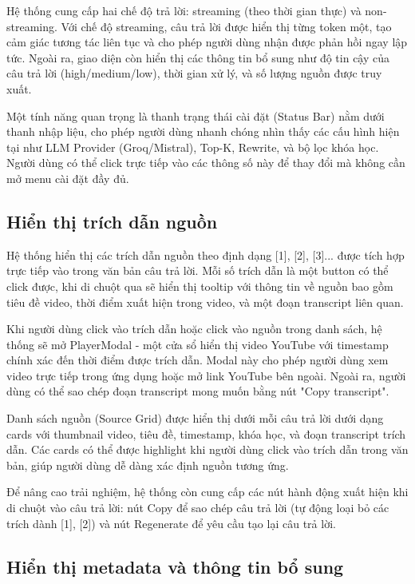 Hệ thống cung cấp hai chế độ trả lời: streaming (theo thời gian thực) và non-streaming. Với chế độ streaming, câu trả lời được hiển thị từng token một, tạo cảm giác tương tác liên tục và cho phép người dùng nhận được phản hồi ngay lập tức. Ngoài ra, giao diện còn hiển thị các thông tin bổ sung như độ tin cậy của câu trả lời (high/medium/low), thời gian xử lý, và số lượng nguồn được truy xuất.

Một tính năng quan trọng là thanh trạng thái cài đặt (Status Bar) nằm dưới thanh nhập liệu, cho phép người dùng nhanh chóng nhìn thấy các cấu hình hiện tại như LLM Provider (Groq/Mistral), Top-K, Rewrite, và bộ lọc khóa học. Người dùng có thể click trực tiếp vào các thông số này để thay đổi mà không cần mở menu cài đặt đầy đủ.

\subsection{Hiển thị trích dẫn nguồn}

Hệ thống hiển thị các trích dẫn nguồn theo định dạng [1], [2], [3]... được tích hợp trực tiếp vào trong văn bản câu trả lời. Mỗi số trích dẫn là một button có thể click được, khi di chuột qua sẽ hiển thị tooltip với thông tin về nguồn bao gồm tiêu đề video, thời điểm xuất hiện trong video, và một đoạn transcript liên quan.

Khi người dùng click vào trích dẫn hoặc click vào nguồn trong danh sách, hệ thống sẽ mở PlayerModal - một cửa sổ hiển thị video YouTube với timestamp chính xác đến thời điểm được trích dẫn. Modal này cho phép người dùng xem video trực tiếp trong ứng dụng hoặc mở link YouTube bên ngoài. Ngoài ra, người dùng có thể sao chép đoạn transcript mong muốn bằng nút "Copy transcript".

Danh sách nguồn (Source Grid) được hiển thị dưới mỗi câu trả lời dưới dạng cards với thumbnail video, tiêu đề, timestamp, khóa học, và đoạn transcript trích dẫn. Các cards có thể được highlight khi người dùng click vào trích dẫn trong văn bản, giúp người dùng dễ dàng xác định nguồn tương ứng.

Để nâng cao trải nghiệm, hệ thống còn cung cấp các nút hành động xuất hiện khi di chuột vào câu trả lời: nút Copy để sao chép câu trả lời (tự động loại bỏ các trích dành [1], [2]) và nút Regenerate để yêu cầu tạo lại câu trả lời.

\subsection{Hiển thị metadata và thông tin bổ sung}

